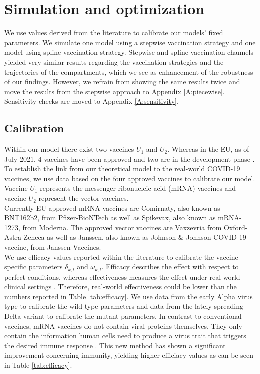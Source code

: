 \section{Simulation and optimization}
We use values derived from the literature to calibrate our models' fixed parameters. We simulate one model using a stepwise vaccination strategy and one model using spline vaccination strategy. Stepwise and spline vaccination channels yielded very similar results regarding the vaccination strategies and the trajectories of the compartments, which we see as enhancement of the robustness of our findings. However, we refrain from showing the same results twice and move the results from the stepwise approach to Appendix \ref{A:piecewise}. Sensitivity checks are moved to Appendix \ref{A:sensitivity}.


\subsection{Calibration}
Within our model there  exist two vaccines $U_1$ and $U_2$. Whereas in the EU, as of July 2021, 4 vaccines have been approved and two are in the development phase \citep{ECa.2021}. To establish the link from our theoretical model to the real-world COVID-19 vaccines, we use data based on the four approved vaccines to calibrate our model. Vaccine $U_1$ represents the messenger ribonucleic acid (mRNA) vaccines and vaccine $U_2$ represent the vector vaccines. \\

Currently EU-approved mRNA vaccines are Comirnaty, also known as BNT162b2, from Pfizer-BioNTech as well as Spikevax, also known as mRNA-1273, from Moderna. The approved vector vaccines are Vaxzevria from Oxford-Astra Zeneca as well as Janssen, also known as Johnson \& Johnson COVID-19 vaccine, from Janssen Vaccines. \\
 
We use efficacy values reported within the literature to calibrate the vaccine-specific parameters $\delta_{k,l}$ and $\omega_{k,l}$. Efficacy describes the effect with respect to perfect conditions, whereas effectiveness measures the effect under real-world clinical settings \citep{Gartlehner.2006}. Therefore, real-world effectiveness could be lower than the numbers reported in Table \ref{tab:efficacy}. 
We use data from the early Alpha virus type to calibrate the wild type parameters and data from the lately spreading Delta variant to calibrate the mutant parameters.  In contrast to conventional vaccines, mRNA vaccines do not contain viral proteins themselves. They only contain the information human cells need to produce a virus trait that triggers the desired immune response \citep{Biontech.2021}. This new method has shown a significant improvement concerning immunity, yielding higher efficiacy values as can be seen in Table \ref{tab:efficacy}. 


